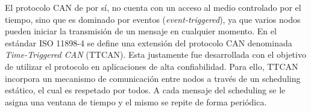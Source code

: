 
El protocolo CAN de por sí, no cuenta con un acceso al medio controlado por el tiempo, sino que es dominado por eventos (\textit{event-triggered}), ya que varios nodos pueden iniciar la transmisión de un mensaje en cualquier momento. En el estándar ISO 11898-4\cite{ISO11898_4} se define una extensión del protocolo CAN denominada \textit{Time-Triggered CAN} (TTCAN). Esta justamente fue desarrollada con el objetivo de utilizar el protocolo en aplicaciones de alta confiabilidad. Para ello, TTCAN incorpora un mecanismo de comunicación entre nodos a través de un scheduling estático, el cual es respetado por todos. A cada mensaje del scheduling se le asigna una ventana de tiempo y el mismo se repite de forma periódica.







